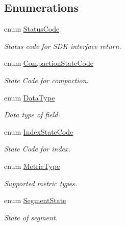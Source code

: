 \subsection*{Enumerations}
\begin{DoxyCompactItemize}
\item 
\mbox{\label{namespacemilvus_ad8f8a6a0abb456a62ed9fec3f2ff1f23}} 
enum \hyperlink{namespacemilvus_ad8f8a6a0abb456a62ed9fec3f2ff1f23}{Status\+Code} \begin{DoxyCompactList}\small\item\em Status code for S\+DK interface return. \end{DoxyCompactList}
\item 
\mbox{\label{namespacemilvus_ae2c03b3dbf792fba6a8ab10cb3a7cc5a}} 
enum \hyperlink{namespacemilvus_ae2c03b3dbf792fba6a8ab10cb3a7cc5a}{Compaction\+State\+Code} \begin{DoxyCompactList}\small\item\em State Code for compaction. \end{DoxyCompactList}
\item 
\mbox{\label{namespacemilvus_a3bdf02cc09dcb59a1e1d2f287d90788b}} 
enum \hyperlink{namespacemilvus_a3bdf02cc09dcb59a1e1d2f287d90788b}{Data\+Type} \begin{DoxyCompactList}\small\item\em Data type of field. \end{DoxyCompactList}
\item 
\mbox{\label{namespacemilvus_a41d88e00964bea51a391cff73f2cb256}} 
enum \hyperlink{namespacemilvus_a41d88e00964bea51a391cff73f2cb256}{Index\+State\+Code} \begin{DoxyCompactList}\small\item\em State Code for index. \end{DoxyCompactList}
\item 
\mbox{\label{namespacemilvus_a188c0c4910c0aaa1d67c0f089b55c00e}} 
enum \hyperlink{namespacemilvus_a188c0c4910c0aaa1d67c0f089b55c00e}{Metric\+Type} \begin{DoxyCompactList}\small\item\em Supported metric types. \end{DoxyCompactList}
\item 
\mbox{\label{namespacemilvus_abe8ed76f6dc4b1b12a59f67fcef5afed}} 
enum \hyperlink{namespacemilvus_abe8ed76f6dc4b1b12a59f67fcef5afed}{Segment\+State} \begin{DoxyCompactList}\small\item\em State of segment. \end{DoxyCompactList}
\end{DoxyCompactItemize}
